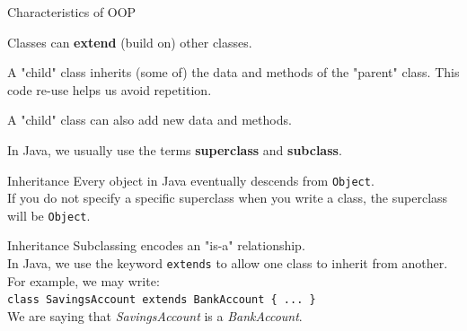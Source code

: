 \documentclass[aspectratio=169]{beamer}
\newenvironment{deflist}
{ \begin{description}
    \setlength{\itemsep}{6pt}
    \setlength{\parskip}{0pt}
    \setlength{\parsep}{0pt}     }
{ \end{description}                  }
\begin{document}
\begin{frame}{Characteristics of OOP}
	\begin{deflist}
		\item[Inheritance]
		Classes can \textbf{extend} (build on) other classes.
		\item[] A "child" class inherits (some of) the data and methods of the "parent" class. This code re-use helps us avoid repetition.
		\item[] A "child" class can also add new data and methods.
		\item[] In Java, we usually use the terms \textbf{superclass} and \textbf{subclass}.
	\end{deflist}
\end{frame}



\begin{frame}{Inheritance}
Every object in Java eventually descends from \texttt{Object}. \\
\vspace{1em}
If you do not specify a specific superclass when you write a class, the superclass will be \texttt{Object}. \\
\end{frame}



\begin{frame}[fragile]{Inheritance}
Subclassing encodes an "is-a" relationship. \\
\vspace{1em}
In Java, we use the keyword \texttt{extends} to allow one class to inherit from another. For example, we may write: \\ 
\vspace{1em}
\texttt{class SavingsAccount extends BankAccount \{ ... \}} \\
\vspace{1em}
We are saying that \textit{SavingsAccount} is a \textit{BankAccount}. \\
\end{frame}
\end{document}
